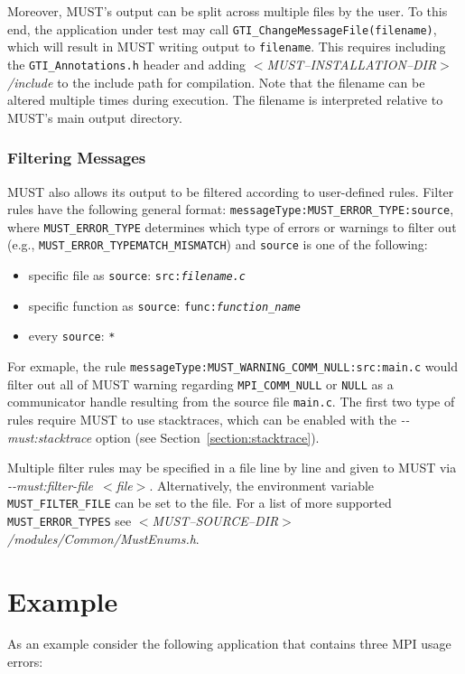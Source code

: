 \documentclass[english]{scrartcl}
\begin{document}
Moreover, MUST's output can be split across multiple files by the user.
To this end, the application under test may call \texttt{GTI\_ChangeMessageFile(filename)}, which will result in MUST writing output to \texttt{filename}.
This requires including the \texttt{GTI\_Annotations.h} header and adding \emph{$<$MUST\mbox{--}INSTALLATION\mbox{--}DIR$>$/include} to the include path for compilation.
Note that the filename can be altered multiple times during execution.
The filename is interpreted relative to MUST's main output directory.

\subsubsection{Filtering Messages}
MUST also allows its output to be filtered according to user-defined rules.
Filter rules have the following general format: \texttt{messageType:MUST\_ERROR\_TYPE:source}, where \texttt{MUST\_ERROR\_TYPE} determines which type of errors or warnings to filter out (e.g., \texttt{MUST\_ERROR\_TYPEMATCH\_MISMATCH}) and \texttt{source} is one of the following:

\begin{itemize}
    \item specific file as \texttt{source}: \texttt{src:\textit{filename.c}}
    \item specific function as \texttt{source}: \texttt{func:\textit{function\_name}}
    \item every \texttt{source}: \texttt{*}
\end{itemize}

For exmaple, the rule \texttt{messageType:MUST\_WARNING\_COMM\_NULL:src:main.c} would filter out all of MUST warning regarding \texttt{MPI\_COMM\_NULL} or \texttt{NULL} as a communicator handle resulting from the source file \texttt{main.c}.
The first two type of rules require MUST to use stacktraces, which can be enabled with the \mbox{\emph{\mbox{-{}-must:stacktrace}}} option (see Section~\ref{section:stacktrace}).

Multiple filter rules may be specified in a file line by line and given to MUST via \mbox{\emph{\mbox{-{}-must:filter-file $<$file$>$}}}.
Alternatively, the environment variable \texttt{MUST\_FILTER\_FILE} can be set to the file.
For a list of more supported \texttt{MUST\_ERROR\_TYPES} see \emph{$<$MUST\mbox{--}SOURCE\mbox{--}DIR$>$/modules/Common/MustEnums.h}.

\section{Example}
As an example consider the following application that contains three MPI usage
errors:
\end{document}

